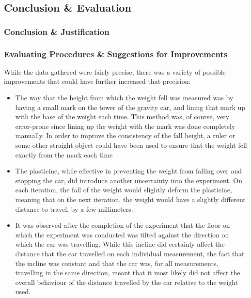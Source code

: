 \documentclass[titlepage,12pt]{article}
\begin{document}
            \FloatBarrier

    \subsection{Conclusion \& Evaluation}
        \subsubsection{Conclusion \& Justification}
        \subsubsection{Evaluating Procedures \& Suggestions for Improvements}
            While the data gathered were fairly precise, there was a variety of
            possible improvements that could have further increased that
            precision:
        
            \begin{itemize}
                \item The way that the height from which the weight fell was
                    measured was by having a small mark on the tower of the
                    gravity car, and  lining that mark up with the base of the
                    weight each time. This method was, of course, very
                    error-prone since lining up the weight with the mark was
                    done completely manually. In order to improve the
                    consistency of the fall height, a ruler or some other
                    straight object could have been used to ensure that the
                    weight fell exactly from the mark each time

                \item The plasticine, while effective in preventing the weight
                    from falling over and stopping the car, did introduce
                    another uncertainty into the experiment. On each iteration,
                    the fall of the weight would slightly deform the plasticine,
                    meaning that on the next iteration, the weight would have a
                    slightly different distance to travel, by a few millimeters. 

                \item It was observed after the completion of the experiment
                    that the floor on which the experiment was conducted was
                    tilted against the direction on which the car was
                    travelling. While this incline did certainly affect the
                    distance that the car travelled on each individual
                    measurement, the fact that the incline was constant and that
                    the car was, for all measurements, travelling in the same
                    direction, meant that it most likely did not affect the
                    overall behaviour of the distance travelled by the car
                    relative to the weight used. 
            \end{itemize}
\end{document}

